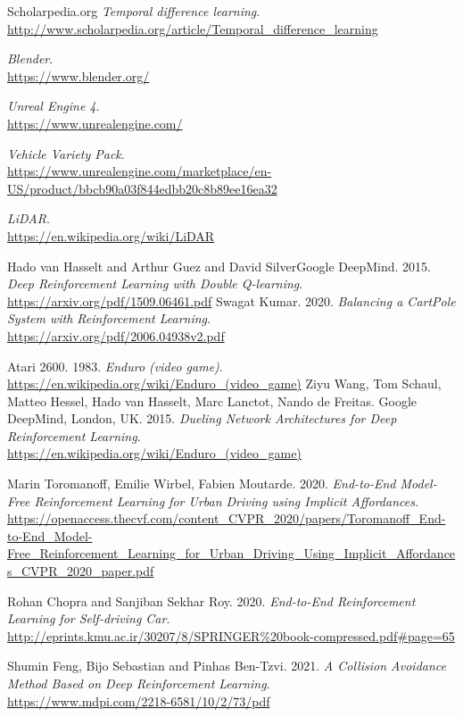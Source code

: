 \documentclass[14pt]{extarticle}
\begin{document}
\begin{thebibliography}{999}
  Scholarpedia.org
  \emph{Temporal difference learning}.\\
  \url{http://www.scholarpedia.org/article/Temporal_difference_learning}
 
  \emph{Blender}.\\
  \url{https://www.blender.org/}
   
  \emph{Unreal Engine 4}.\\
  \url{https://www.unrealengine.com/}
   
   
  \emph{Vehicle Variety Pack}.\\
  \url{https://www.unrealengine.com/marketplace/en-US/product/bbcb90a03f844edbb20c8b89ee16ea32}
  
  \emph{LiDAR}.\\
  \url{https://en.wikipedia.org/wiki/LiDAR}
  
  Hado van Hasselt and Arthur Guez and David SilverGoogle DeepMind. 2015.
  \emph{Deep Reinforcement Learning with Double Q-learning}.\\
  \url{  https://arxiv.org/pdf/1509.06461.pdf}
  Swagat Kumar. 2020.
  \emph{Balancing a CartPole System with Reinforcement Learning}.\\
  \url{https://arxiv.org/pdf/2006.04938v2.pdf}
 
 
  	Atari 2600. 1983.
  \emph{Enduro (video game)}.\\
  \url{https://en.wikipedia.org/wiki/Enduro_(video_game)}
  	Ziyu Wang, Tom Schaul, Matteo Hessel, Hado van Hasselt, Marc Lanctot, Nando de Freitas. Google DeepMind, London, UK. 2015.
  \emph{Dueling Network Architectures for Deep Reinforcement Learning}.\\
  \url{https://en.wikipedia.org/wiki/Enduro_(video_game)}
   
   
  	Marin Toromanoff, Emilie Wirbel, Fabien Moutarde. 2020.
  \emph{End-to-End Model-Free Reinforcement Learning
for Urban Driving using Implicit Affordances}.\\
  \url{https://openaccess.thecvf.com/content_CVPR_2020/papers/Toromanoff_End-to-End_Model-Free_Reinforcement_Learning_for_Urban_Driving_Using_Implicit_Affordances_CVPR_2020_paper.pdf}

  	Rohan Chopra and Sanjiban Sekhar Roy. 2020.
  \emph{End-to-End Reinforcement Learning
for Self-driving Car}.\\
  \url{http://eprints.kmu.ac.ir/30207/8/SPRINGER\%20book-compressed.pdf\#page=65}
  
  
  
  	Shumin Feng, Bijo Sebastian and Pinhas Ben-Tzvi. 2021.
  \emph{A Collision Avoidance Method Based on Deep
Reinforcement Learning}.\\
  \url{https://www.mdpi.com/2218-6581/10/2/73/pdf}

\end{thebibliography}
\end{document}
